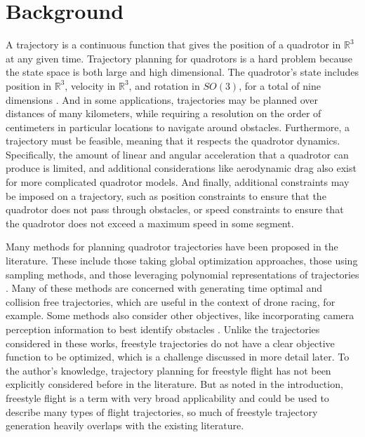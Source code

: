 \documentclass[pageno]{jpaper}
\begin{document}
\section{Background}

A trajectory is a continuous function that gives the position of a quadrotor in $\mathbb{R}^3$ at any given time. Trajectory planning for quadrotors is a hard problem because the state space is both large and high dimensional. The quadrotor's state includes position in $\mathbb{R}^3$, velocity in $\mathbb{R}^3$, and rotation in $SO(3)$, for a total of nine dimensions \cite{mueller}. And in some applications, trajectories may be planned over distances of many kilometers, while requiring a resolution on the order of centimeters in particular locations to navigate around obstacles. Furthermore, a trajectory must be feasible, meaning that it respects the quadrotor dynamics. Specifically, the amount of linear and angular acceleration that a quadrotor can produce is limited, and additional considerations like aerodynamic drag also exist for more complicated quadrotor models. And finally, additional constraints may be imposed on a trajectory, such as position constraints to ensure that the quadrotor does not pass through obstacles, or speed constraints to ensure that the quadrotor does not exceed a maximum speed in some segment.

Many methods for planning quadrotor trajectories have been proposed in the literature. These include those taking global optimization approaches, those using sampling methods, and those leveraging polynomial representations of trajectories \cite{hanover}. Many of these methods are concerned with generating time optimal and collision free trajectories, which are useful in the context of drone racing, for example. Some methods also consider other objectives, like incorporating camera perception information to best identify obstacles \cite{zhou}. Unlike the trajectories considered in these works, freestyle trajectories do not have a clear objective function to be optimized, which is a challenge discussed in more detail later. To the author's knowledge, trajectory planning for freestyle flight has not been explicitly considered before in the literature. But as noted in the introduction, freestyle flight is a term with very broad applicability and could be used to describe many types of flight trajectories, so much of freestyle trajectory generation heavily overlaps with the existing literature.
\end{document}
